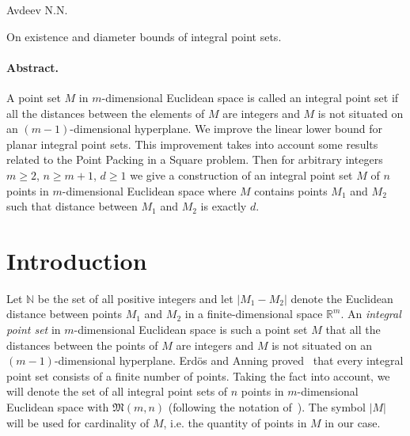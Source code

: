 \documentclass[a4paper,14pt]{article} %
\theoremstyle{plain}
\begin{document}
\renewcommand{\bibname}{Список цитированной литературы}
\renewcommand\refname{\bibname}

Avdeev N.N.

On existence and diameter bounds of integral point sets.

\paragraph{Abstract.}
A point set $M$ in $m$-dimensional Euclidean space is called an integral point set if all the distances between the
elements of $M$ are integers and $M$ is not situated on an $(m-1)$-dimensional hyperplane.
We improve the linear lower bound for planar integral point sets.
This improvement takes into account some results related to the Point Packing in a Square problem.
Then for arbitrary integers $m \geq 2$, $n \geq m+1$, $d \geq 1$
we give a construction of an integral point set $M$ of $n$ points in $m$-dimensional Euclidean space
where $M$ contains points $M_1$ and $M_2$ such that distance between $M_1$ and $M_2$ is exactly $d$.



\section{Introduction}
Let $\mathbb{N}$ be the set of all positive integers and let $|M_1 - M_2|$ denote the Euclidean distance
between points $M_1$ and $M_2$ in a finite-dimensional space $\mathbb{R}^m$.
An \textit{integral point set} in $m$-dimensional Euclidean space is such a point set $M$ that all the distances between the
points of $M$ are integers and $M$ is not situated on an $(m-1)$-dimensional hyperplane.
Erd\"os and Anning proved~\cite{anning1945integral,erdos1945integral} that every integral point set consists of a finite number of points.
Taking the fact into account, we will denote the set of all integral point sets of $n$ points in $m$-dimensional Euclidean space with
$\mathfrak{M}(m,n)$ (following the notation of~\cite{our-vmmsh-2018}).
The symbol $|M|$ will be used for cardinality of $M$, i.e. the quantity of points in $M$ in our case.
\end{document}
